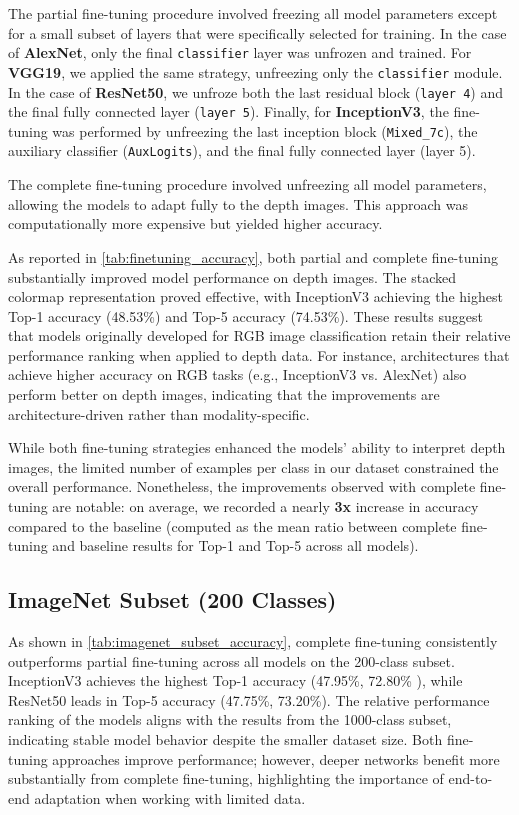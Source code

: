 The partial fine-tuning procedure involved freezing all model parameters except for a small subset of layers that were specifically selected for training. In the case of \textbf{AlexNet}, only the final \texttt{classifier} layer was unfrozen and trained. For \textbf{VGG19}, we applied the same strategy, unfreezing only the \texttt{classifier} module. In the case of \textbf{ResNet50}, we unfroze both the last residual block (\texttt{layer 4}) and the final fully connected layer (\texttt{layer 5}). Finally, for \textbf{InceptionV3}, the fine-tuning was performed by unfreezing the last inception block (\texttt{Mixed\_7c}), the auxiliary classifier (\texttt{AuxLogits}), and the final fully connected layer (layer 5).

The complete fine-tuning procedure involved unfreezing all model parameters, allowing the models to adapt fully to the depth images. This approach was computationally more expensive but yielded higher accuracy.

As reported in \autoref{tab:finetuning_accuracy}, both partial and complete fine-tuning substantially improved model performance on depth images. The stacked colormap representation proved effective, with InceptionV3 achieving the highest Top-1 accuracy (48.53\%) and Top-5 accuracy (74.53\%). These results suggest that models originally developed for RGB image classification retain their relative performance ranking when applied to depth data. For instance, architectures that achieve higher accuracy on RGB tasks (e.g., InceptionV3 vs. AlexNet) also perform better on depth images, indicating that the improvements are architecture-driven rather than modality-specific.

While both fine-tuning strategies enhanced the models' ability to interpret depth images, the limited number of examples per class in our dataset constrained the overall performance. Nonetheless, the improvements observed with complete fine-tuning are notable: on average, we recorded a nearly \textbf{3x} increase in accuracy compared to the baseline (computed as the mean ratio between complete fine-tuning and baseline results for Top-1 and Top-5 across all models). 

\subsection{ImageNet Subset (200 Classes)}

As shown in \autoref{tab:imagenet_subset_accuracy}, complete fine-tuning consistently outperforms partial fine-tuning across all models on the 200-class subset. InceptionV3 achieves the highest Top-1 accuracy (47.95\%, 72.80\% ), while ResNet50 leads in Top-5 accuracy (47.75\%, 73.20\%). The relative performance ranking of the models aligns with the results from the 1000-class subset, indicating stable model behavior despite the smaller dataset size. Both fine-tuning approaches improve performance; however, deeper networks benefit more substantially from complete fine-tuning, highlighting the importance of end-to-end adaptation when working with limited data.

